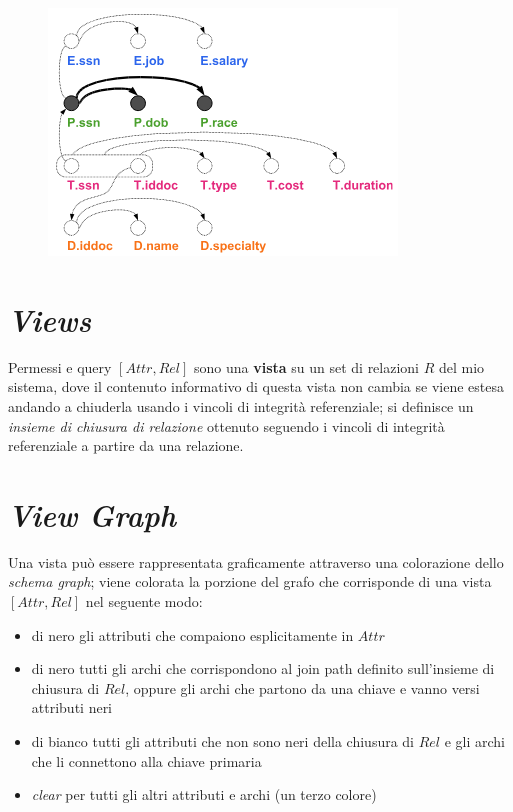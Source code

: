 \documentclass{report}
\begin{document}
\begin{figure}[H]
    \centering
    \includegraphics[width=0.7\linewidth]{images/view-graph.png}
\end{figure}

\section{\textit{Views}}

Permessi e query $[Attr, Rel]$ sono una \textbf{vista} su un set di relazioni $R$ del mio sistema, dove 
il contenuto informativo di questa vista non cambia se viene estesa andando a chiuderla usando i vincoli di integrità referenziale; si definisce 
un \textit{insieme di chiusura di relazione} ottenuto seguendo i vincoli di integrità referenziale a partire da una relazione.

\section{\textit{View Graph}}
Una vista può essere rappresentata graficamente attraverso una colorazione dello \textit{schema graph}; viene colorata la porzione del grafo che corrisponde 
di una vista $[Attr, Rel]$ nel seguente modo:
\begin{itemize}
    \item di nero gli attributi che compaiono esplicitamente in $Attr$
    \item di nero tutti gli archi che corrispondono al join path definito sull'insieme di chiusura di $Rel$, oppure gli archi che partono 
    da una chiave e vanno versi attributi neri
    \item di bianco tutti gli attributi che non sono neri della chiusura di $Rel$ e gli archi che li connettono alla chiave primaria
    \item \textit{clear} per tutti gli altri attributi e archi (un terzo colore)
\end{itemize}
\end{document}
